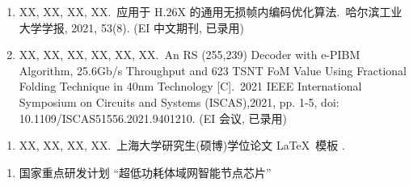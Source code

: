 \begin{publications}
    \begin{enumerate}
        \item XX, XX, XX, XX.\,
              应用于 H.26X 的通用无损帧内编码优化算法.\,
              哈尔滨工业大学学报, 2021, 53(8). (EI 中文期刊, 已录用)

        \item XX, XX, XX, XX, XX, XX.\,
              An RS (255,239) Decoder with e-PIBM Algorithm, 25.6Gb/s Throughput and 623 TSNT FoM Value Using Fractional Folding Technique in 40nm Technology [C].\,
              2021 IEEE International Symposium on Circuits and Systems (ISCAS),2021, pp. 1-5, doi: 10.1109/ISCAS51556.2021.9401210. (EI 会议, 已录用)
    \end{enumerate}

    \begin{enumerate}
        \item XX, XX, XX, XX.\,
        上海大学研究生(硕博)学位论文 \LaTeX\ 模板 \shuthesis.
    \end{enumerate}

    \begin{enumerate}
        \item 国家重点研发计划 “超低功耗体域网智能节点芯片”
    \end{enumerate}
\end{publications}